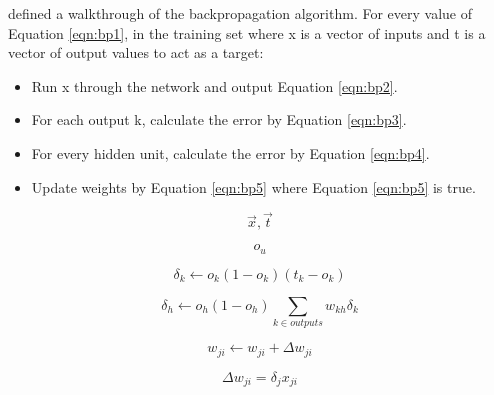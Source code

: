 \parencite{MLANN} defined a walkthrough of the backpropagation algorithm.
For every value of Equation \ref{eqn:bp1}, in the training set where x is a vector of inputs and t is a vector of output values to act as a target:
\begin{itemize}
	\item{Run x through the network and output Equation \ref{eqn:bp2}.}
	\item{For each output k, calculate the error by Equation \ref{eqn:bp3}.}
	\item{For every hidden unit, calculate the error by Equation \ref{eqn:bp4}.}
	\item{Update weights by Equation \ref{eqn:bp5} where Equation \ref{eqn:bp5} is true.}
\end{itemize}

\begin{equation}\label{eqn:bp1}
    \vec{x}, \vec{t}
\end{equation}

\begin{equation}\label{eqn:bp2}
    o_{u}
\end{equation}

\begin{equation}\label{eqn:bp3}
    \delta_{k} \leftarrow o_{k}(1 - o_{k})(t_{k} - o_{k}) 
\end{equation}

\begin{equation}\label{eqn:bp4}
    \delta_{h} \leftarrow o_{h}(1 - o_{h}) \sum_{k \in outputs}   w_{kh}\delta_{k}
\end{equation}

\begin{equation}\label{eqn:bp5}
    w_{ji} \leftarrow w_{ji} + \Delta w_{ji}
\end{equation}

\begin{equation}\label{eqn:bp6}
    \Delta w_{ji} = \delta_{j} x_{ji}
\end{equation}
